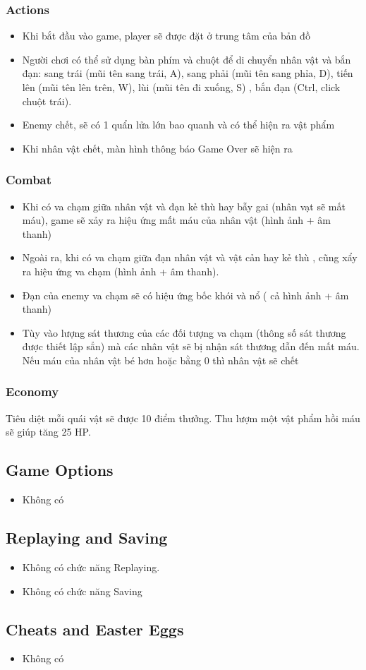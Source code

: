 \documentclass[../report.tex]{subfiles}
\begin{document}
\subsubsection{Actions}
\begin{itemize}
\item Khi bắt đầu vào game, player sẽ được đặt ở trung tâm của bản đồ

\item Người chơi có thể sử dụng bàn phím và chuột để di chuyển nhân vật và bắn đạn: sang trái (mũi tên sang trái, A), sang phải (mũi tên sang phỉa, D), tiến lên (mũi tên lên trên, W), lùi (mũi tên đi xuống, S) , bắn đạn (Ctrl, click chuột trái).
\item Enemy chết, sẽ có 1 quẩn lửa lớn bao quanh và có thể hiện ra vật phẩm
\item Khi nhân vật chết, màn hình thông báo Game Over sẽ hiện ra 
\end{itemize}

\subsubsection{Combat}
\begin{itemize}
\item Khi có va chạm giữa nhân vật và đạn kẻ thù hay bẫy gai (nhân vạt sẽ mất máu), game sẽ xảy ra hiệu ứng mất máu của nhân vật (hình ảnh + âm thanh)
\item Ngoài ra, khi có va chạm giữa đạn nhân vật và vật cản hay kẻ thù , cũng xẩy ra hiệu ứng va chạm (hình ảnh + âm thanh). 
\item Đạn của enemy va chạm sẽ có hiệu ứng bốc khói và nổ ( cả hình ảnh + âm thanh)
\item Tùy vào lượng sát thương của các đối tượng va chạm (thông số sát thương được thiết lập sẳn)
    mà các nhân vật sẽ bị nhận sát thương dẫn đến mất máu.
    Nếu máu của nhân vật bé hơn hoặc bằng 0 thì nhân vật sẽ chết

\end{itemize}

\subsubsection{Economy}
Tiêu diệt mỗi quái vật sẽ được 10 điểm thưởng.
Thu lượm một vật phẩm hồi máu sẽ giúp tăng 25 HP. 

\subsection{Game Options}
\begin{itemize}
\item Không có
\end{itemize}

\subsection{Replaying and Saving}
\begin{itemize}
\item Không có chức năng Replaying. 
\item Không có chức năng Saving
\end{itemize}

\subsection{Cheats and Easter Eggs}
\begin{itemize}
\item Không có
\end{itemize}
\end{document}

